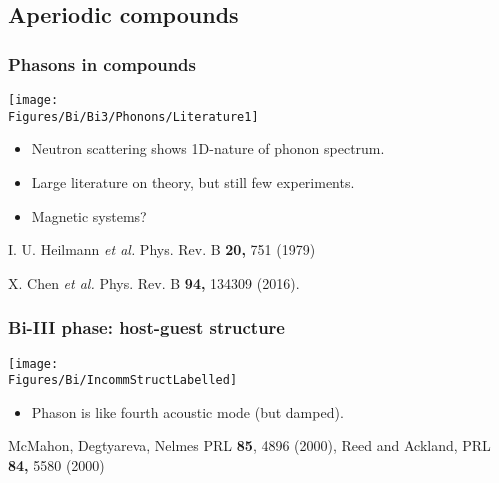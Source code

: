 
\subsection{Aperiodic compounds}
\begin{frame}
\frametitle{Phasons in compounds}
\centerline{\texttt{[image: \\Figures/Bi/Bi3/Phonons/Literature1]}}

\vspace{1.5em}
\begin{itemize}
\item
Neutron scattering shows 1D-nature of phonon spectrum.
\item
Large literature on theory, but still few experiments.
\item
Magnetic systems?
\end{itemize}

\vspace*{\fill}
\vspace{0.5em}
\centerline{\makebox[\linewidth]{\rule{0.85\textwidth}{0.4pt}}}
\centerline{\scriptsize I. U. Heilmann  {\it et al.} Phys. Rev. B {\bf
    20,} 751 (1979)}
\centerline{\scriptsize X. Chen {\it et al.} Phys. Rev. B {\bf 94,} 134309 (2016).}
\end{frame}




\begin{frame}[label=BiIntro]
\frametitle{Bi-III phase: host-guest structure}
\centerline{\texttt{[image: \\Figures/Bi/IncommStructLabelled]}}
\begin{itemize}
\item <visible@2->Phason is like fourth acoustic mode (but damped).


\end{itemize}

\vspace*{\fill}
\vspace{1.5em}
\centerline{\makebox[\linewidth]{\rule{0.85\textwidth}{0.4pt}}}
\centerline{\scriptsize McMahon, Degtyareva, Nelmes PRL {\bf 85}, 4896
  (2000), Reed and Ackland, PRL {\bf 84,} 5580 (2000)}
\end{frame}



